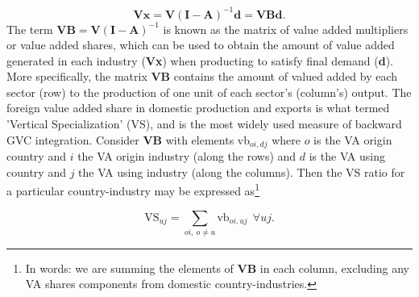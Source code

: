 \documentclass[a4paper]{article}
\begin{document}
\begin{equation} \label{eq:VB}
\textbf{V}\textbf{x} = \textbf{V}(\textbf{I}-\textbf{A})^{-1} \textbf{d} = \textbf{VBd}.
\end{equation}
The term $\textbf{VB} = \textbf{V}(\textbf{I}-\textbf{A})^{-1}$ is known as the matrix of value added multipliers or value added shares, which can be used to obtain the amount of value added generated in each industry (\textbf{Vx}) when producting to satisfy final demand (\textbf{d}). More specifically, the matrix $\textbf{VB}$ contains the amount of valued added by each sector (row) to the production of one unit of each sector's (column's) output. %
The foreign value added share in domestic production and exports is what \citet{hummels2001nature} termed 'Vertical Specialization' (VS), and is the most widely used measure of backward GVC integration. Consider \textbf{VB} with elements vb$_{oi,dj}$ where $o$ is the VA origin country and $i$ the VA origin industry (along the rows) and $d$ is the VA using country and $j$ the VA using industry (along the columns). Then the VS ratio for a particular country-industry may be expressed as\footnote{In words: we are summing the elements of \textbf{VB} in each column, excluding any VA shares components from domestic country-industries.}

\begin{equation} \label{eq:VS}
\text{VS}_{uj} = \sum_{oi,\ o \neq  u} \text{vb}_{oi, uj}\ \ \forall uj.
\end{equation}
\end{document}
